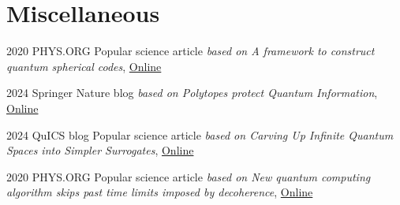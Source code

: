 \section{Miscellaneous}


\cventry
  {2020}
  {PHYS.ORG}
  {}
  {Popular science article}
  {\textit{based on \cite{jainQuantumSphericalCodes2023}}}
  {\textit{A framework to construct quantum spherical codes}, \href{https://phys.org/news/2024-06-framework-quantum-spherical-codes.html}{Online}}

\cventry
  {2024}
  {Springer Nature blog}
  {}
  {}
  {\textit{based on \cite{jainQuantumSphericalCodes2023}}}
  {\textit{Polytopes protect Quantum Information}, \href{https://communities.springernature.com/posts/polytopes-protect-quantum-information}{Online}}

\cventry 
  {2024}
  {QuICS blog}
  {}
  {Popular science article}
  {\textit{based on \cite{iosueContinuousvariableQuantumState2022}}}
  {\textit{Carving Up Infinite Quantum Spaces into Simpler Surrogates}, \href{https://quics.umd.edu/news/carving-infinite-quantum-spaces-simpler-surrogates}{Online}}





\cventry
  {2020}
  {PHYS.ORG}
  {}
  {Popular science article}
  {\textit{based on \cite{cirstoiuVariationalFastForwarding2020}}}
  {\textit{New quantum computing algorithm skips past time limits imposed by decoherence}, \href{https://phys.org/news/2020-10-quantum-algorithm-limits-imposed-decoherence.html}{Online}}
